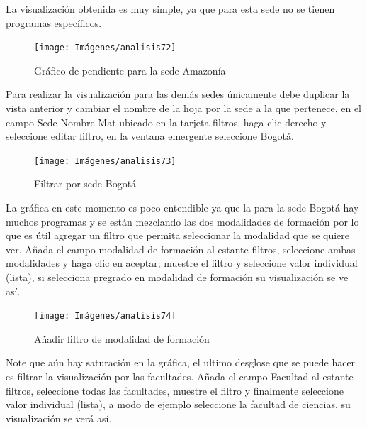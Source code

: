 \documentclass[
]{book}
\begin{document}
La visualización obtenida es muy simple, ya que para esta sede no se tienen programas específicos.

\begin{figure}

{\centering \texttt{[image: Imágenes/analisis72]} 

}

\caption{Gráfico de pendiente para la sede Amazonía}\label{fig:graficopendienteamazonia-fig}
\end{figure}

Para realizar la visualización para las demás sedes únicamente debe duplicar la vista anterior y cambiar el nombre de la hoja por la sede a la que pertenece, en el campo Sede Nombre Mat ubicado en la tarjeta filtros, haga clic derecho y seleccione editar filtro, en la ventana emergente seleccione Bogotá.

\begin{figure}

{\centering \texttt{[image: Imágenes/analisis73]} 

}

\caption{Filtrar por sede Bogotá}\label{fig:paso1graficopendientebogota-fig}
\end{figure}

La gráfica en este momento es poco entendible ya que la para la sede Bogotá hay muchos programas y se están mezclando las dos modalidades de formación por lo que es útil agregar un filtro que permita seleccionar la modalidad que se quiere ver. Añada el campo modalidad de formación al estante filtros, seleccione ambas modalidades y haga clic en aceptar; muestre el filtro y seleccione valor individual (lista), si selecciona pregrado en modalidad de formación su visualización se ve así.

\begin{figure}

{\centering \texttt{[image: Imágenes/analisis74]} 

}

\caption{Añadir filtro de modalidad de formación}\label{fig:paso2graficopendientebogota-fig}
\end{figure}

Note que aún hay saturación en la gráfica, el ultimo desglose que se puede hacer es filtrar la visualización por las facultades. Añada el campo Facultad al estante filtros, seleccione todas las facultades, muestre el filtro y finalmente seleccione valor individual (lista), a modo de ejemplo seleccione la facultad de ciencias, su visualización se verá así.
\end{document}
